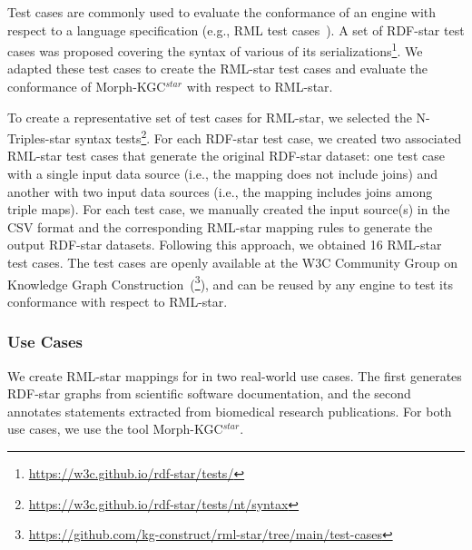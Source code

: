 Test cases are commonly used %
to evaluate the conformance of an engine with respect to a language specification (e.g., RML test cases~\citep{heyvaert2019conformance}). 
A set of \mbox{RDF-star} test cases was proposed
covering the syntax of various of its serializations\footnote{\url{https://w3c.github.io/rdf-star/tests/}}.
We adapted these test cases to create the RML-star test cases and evaluate the conformance of \mbox{Morph-KGC$^{star}$}
with respect to \mbox{RML-star}.

To create a representative set of test cases for \mbox{RML-star}, we selected the N-Triples-star syntax tests\footnote{\url{https://w3c.github.io/rdf-star/tests/nt/syntax}}.  %
For each \mbox{RDF-star} test case, we created two associated \mbox{RML-star} test cases that generate the original \mbox{RDF-star} dataset: one test case with a single input data source (i.e., the mapping does not include joins) and another with two input data sources (i.e., the mapping includes joins among triple maps).
For each test case, we manually created the input source(s) in the CSV format and the corresponding \mbox{RML-star} mapping rules to generate the output \mbox{RDF-star} datasets.
Following this approach, we obtained 16 \mbox{RML-star} test cases.
The test cases are openly available at the W3C Community Group on Knowledge Graph Construction~(\footnote{\url{https://github.com/kg-construct/rml-star/tree/main/test-cases}}),
and can be reused by any engine to test its conformance with respect to \mbox{RML-star}.


\subsubsection{Use Cases}
\label{sec:chp4_star_usecases}

We create RML-star mappings for in two real-world use cases. 
The first generates \mbox{RDF-star} graphs from scientific software documentation, 
and the second annotates statements extracted from biomedical research publications. 
For both use cases, we use the tool \mbox{Morph-KGC$^{star}$}.














